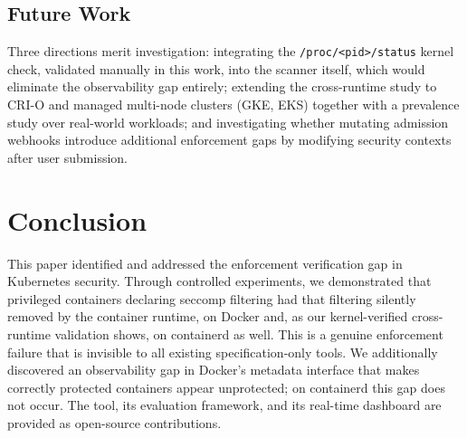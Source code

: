 \documentclass[sigconf]{acmart}
\begin{document}
\subsection{Future Work}

Three directions merit investigation: integrating the \texttt{/proc/<pid>/status} kernel check, validated manually in this work, into the scanner itself, which would eliminate the observability gap entirely; extending the cross-runtime study to CRI-O and managed multi-node clusters (GKE, EKS) together with a prevalence study over real-world workloads; and investigating whether mutating admission webhooks introduce additional enforcement gaps by modifying security contexts after user submission.

\section{Conclusion}

This paper identified and addressed the enforcement verification gap in Kubernetes security. Through controlled experiments, we demonstrated that privileged containers declaring seccomp filtering had that filtering silently removed by the container runtime, on Docker and, as our kernel-verified cross-runtime validation shows, on containerd as well. This is a genuine enforcement failure that is invisible to all existing specification-only tools. We additionally discovered an observability gap in Docker's metadata interface that makes correctly protected containers appear unprotected; on containerd this gap does not occur. The tool, its evaluation framework, and its real-time dashboard are provided as open-source contributions.




\end{document}

